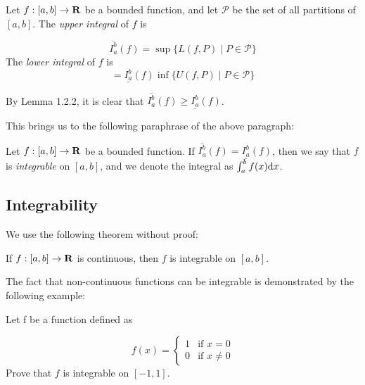 \documentclass{article}
\begin{document}
  \begin{defi}
    Let \(f: [a,b] \to \mathbf{R}\) be a bounded function, and let \(\mathcal{P}\) be the set of all partitions of \([a,b]\). The \emph{upper integral} of \(f\) is

    \[
      \overline{I_{a}^{b}}(f) = \sup\{L(f, P) \mid P \in \mathcal{P}\}
    \]
    The \emph{lower integral} of \(f\) is
    \[
       =\underline{I_{a}^{b}}(f) \inf\{U(f, P) \mid P \in \mathcal{P}\}
    \]
  \end{defi}

  \begin{remark}
    By Lemma 1.2.2, it is clear that \(\overline{I_{a}^{b}}(f) \geq \underline{I_{a}^{b}}(f)\).
  \end{remark}

  This brings us to the following paraphrase of the above paragraph:

  \begin{defi}[Integrability]
    \everymath{\displaystyle}
    Let \(f: [a,b] \to \mathbf{R}\) be a bounded function. If \(\overline{I_{a}^{b}}(f) = \underline{I_{a}^{b}}(f)\), then we say that \(f\) is \emph{integrable} on \([a,b]\), and we denote the integral as \(\int_{a}^{b}{f(x) \mathrm{d} x}\).
  \end{defi}


\subsection{Integrability}

  We use the following theorem without proof:

  \begin{thm}
    If \(f:[a,b] \to \mathbf{R}\) is continuous, then \(f\) is integrable on \([a,b]\).
  \end{thm}

  The fact that non-continuous functions can be integrable is demonstrated by the following example:

  \begin{eg}
    Let f be a function defined as 

    \[
      f(x) = \begin{cases}
        1 & \text{if } x = 0 \\
        0 & \text{if } x \neq 0
      \end{cases}
    \]
    Prove that \(f\) is integrable on \([-1,1]\).
  \end{eg}
\end{document}
